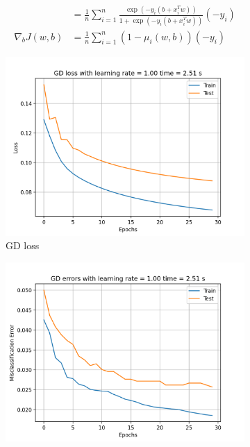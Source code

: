 \documentclass{article}
\begin{document}
\begin{sloppypar}
\begin{aprob}
\begin{enumerate}
\begin{align*}
                &= \frac{1}{n} \sum_{i=1}^n \frac{\exp(-y_i (b + x_i^T w))}{1 + \exp(-y_i (b + x_i^T w))} (-y_i) \\
                \nabla_b J(w,b) &= \frac{1}{n} \sum_{i=1}^n (1-\mu_i(w, b)) (-y_i)
                \end{align*}
            \begin{figure}
                \centering
                \begin{subfigure}{0.45\textwidth}
                    \includegraphics[width=\textwidth]{./img/7-gd-loss.png}
                    \caption{GD loss}
                    \label{fig:gdloss}
                \end{subfigure}
                \hfill
                \begin{subfigure}{0.45\textwidth}
                    \includegraphics[width=\textwidth]{./img/7-gd-errors.png}

\end{subfigure}
\end{figure}
\end{enumerate}
\end{aprob}
\end{sloppypar}
\end{document}

